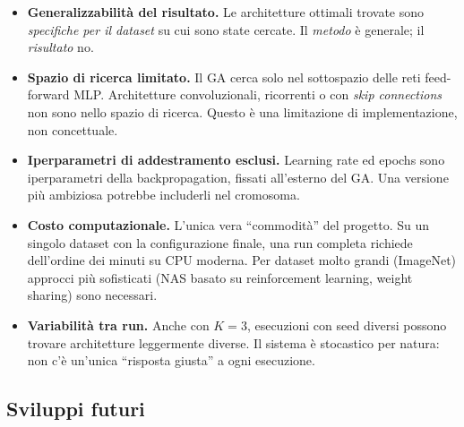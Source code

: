 \documentclass[11pt,a4paper]{article}
\begin{document}
\begin{itemize}
    \item \textbf{Generalizzabilità del risultato.} Le architetture
          ottimali trovate sono \emph{specifiche per il dataset} su cui
          sono state cercate. Il \emph{metodo} è generale; il
          \emph{risultato} no.
    \item \textbf{Spazio di ricerca limitato.} Il GA cerca solo nel
          sottospazio delle reti feed-forward MLP. Architetture
          convoluzionali, ricorrenti o con \emph{skip connections} non
          sono nello spazio di ricerca. Questo è una limitazione di
          implementazione, non concettuale.
    \item \textbf{Iperparametri di addestramento esclusi.} Learning rate
          ed epochs sono iperparametri della backpropagation, fissati
          all'esterno del GA. Una versione più ambiziosa potrebbe
          includerli nel cromosoma.
    \item \textbf{Costo computazionale.} L'unica vera ``commodità'' del
          progetto. Su un singolo dataset con la configurazione finale, una
          run completa richiede dell'ordine dei minuti su CPU moderna.
          Per dataset molto grandi (ImageNet) approcci più sofisticati
          (NAS basato su reinforcement learning, weight sharing) sono
          necessari.
    \item \textbf{Variabilità tra run.} Anche con $K=3$, esecuzioni con
          seed diversi possono trovare architetture leggermente diverse.
          Il sistema è stocastico per natura: non c'è un'unica ``risposta
          giusta'' a ogni esecuzione.
\end{itemize}

\subsection{Sviluppi futuri}
\end{document}
